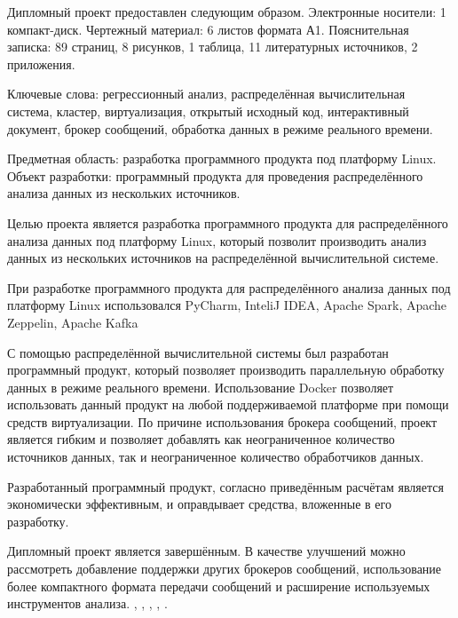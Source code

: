 \label{sec:ref}

Дипломный проект предоставлен следующим образом. Электронные носители: 1
компакт-диск. Чертежный материал: 6 листов формата А1. Пояснительная записка:
89 страниц, 8 рисунков, 1 таблица, 11 литературных источников, 2 приложения.

Ключевые слова: регрессионный анализ, распределённая вычислительная система, кластер, виртуализация, открытый исходный код, интерактивный документ, брокер сообщений, обработка данных в режиме реального времени.

Предметная область: разработка программного продукта под платформу Linux.
Объект разработки: программный продукта для проведения распределённого анализа данных из нескольких источников.

Целью проекта является разработка программного продукта для распределённого анализа данных под платформу Linux, который позволит производить анализ данных из нескольких источников на распределённой вычислительной системе.

При разработке программного продукта для распределённого анализа данных под платформу Linux использовался PyCharm, InteliJ IDEA, Apache Spark, Apache Zeppelin, Apache Kafka

С помощью распределённой вычислительной системы был разработан программный продукт, который позволяет производить параллельную обработку данных в режиме реального времени.
Использование Docker позволяет использовать данный продукт на любой поддерживаемой платформе при помощи средств виртуализации.
По причине использования брокера сообщений, проект является гибким и позволяет добавлять как неограниченное количество источников данных, так и неограниченное количество обработчиков данных.

Разработанный программный продукт, согласно приведённым расчётам является экономически эффективным, и оправдывает средства, вложенные в его разработку.

Дипломный проект является завершённым. В качестве улучшений можно рассмотреть добавление поддержки других брокеров сообщений, использование более компактного формата передачи сообщений и расширение используемых инструментов анализа.
\insertNumPagesText ,
\insertNumFiguresText , \insertNumTablesText ,
\insertNumBibElementsText ,
\insertNumAnnexesText .

\newpage
